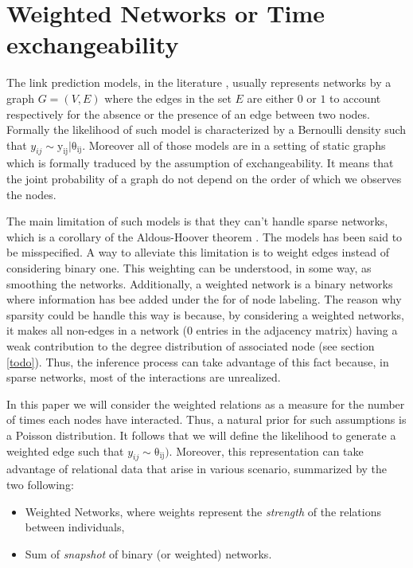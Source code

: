 
\section{Weighted Networks or Time exchangeability}

The link prediction models, in the literature \cite{review1,review2}, usually represents networks by a graph $G=(V,E)$ where the edges in the set $E$ are either $0$ or $1$ to account respectively for the absence or the presence of an edge between two nodes. Formally the likelihood of such model is characterized by a Bernoulli density such that $y_{ij} \sim \mathrm{y_{ij} |\theta_{ij}}$. Moreover all of those models are in a setting of static graphs which is formally traduced by the assumption of exchangeability. It means that the joint probability of a graph do not depend on the order of which we observes the nodes. %

The main limitation of such models is that they can't handle sparse networks, which is a corollary of the Aldous-Hoover theorem \cite{orbanz2015bayesian}. The models has been said to be misspecified. A way to alleviate this limitation is to weight edges instead of considering binary one. This weighting can be understood, in some way, as smoothing the networks. Additionally, a weighted network is a binary networks where information has bee added under the for of node labeling. The reason why sparsity could be handle this way is because, by considering a weighted networks, it makes all non-edges in a network (0 entries in the adjacency matrix) having a weak contribution to the degree distribution of associated node (see section \ref{todo}). Thus, the inference process can take advantage of this fact because, in sparse networks, most of the interactions are unrealized.

In this paper we will consider the weighted relations as a measure for the number of times each nodes have interacted. Thus, a natural prior for such assumptions is a Poisson distribution. It follows that we will define the likelihood to generate a weighted edge such that $y_{ij} \sim \mathrm{\theta_{ij})}$. Moreover, this representation can take advantage of relational data that arise in various scenario, summarized by the two following:
\begin{itemize}
\item Weighted Networks, where weights represent the \emph{strength} of the relations between individuals,
\item Sum of \emph{snapshot} of binary (or weighted) networks.
\end{itemize}

